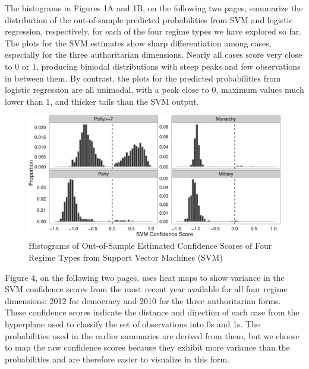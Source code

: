 \documentclass[pdftex,12pt,fullpage,oneside]{amsart}
\begin{document}
The histograms in Figures 1A and 1B, on the following two pages, summarize the distribution of the out-of-sample predicted probabilities from SVM and logistic regression, respectively, for each of the four regime types we have explored so far.  The plots for the SVM estimates show sharp differentiation among cases, especially for the three authoritarian dimensions. Nearly all cases score very close to 0 or 1, producing bimodal distributions with steep peaks and few observations in between them. By contrast, the plots for the predicted probabilities from logistic regression are all unimodal, with a peak close to 0, maximum values much lower than 1, and thicker tails than the SVM output. 

\begin{figure}[ht]
	\centering
	\includegraphics[width=.7\textwidth]{pol_bin_probDist}
	\caption{Histograms of Out-of-Sample Estimated Confidence Scores of Four Regime Types from Support Vector Machines (SVM)}
\end{figure}

Figure 4, on the following two pages, uses heat maps to show variance in the SVM confidence scores from the most recent year available for all four regime dimensions: 2012 for democracy and 2010 for the three authoritarian forms. These confidence scores indicate the distance and direction of each case from the hyperplane used to classify the set of observations into 0s and 1s. The probabilities used in the earlier summaries are derived from them, but we choose to map the raw confidence scores because they exhibit more variance than the probabilities and are therefore easier to visualize in this form.
\end{document}
